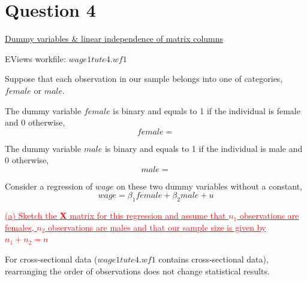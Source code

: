 \documentclass[12pt]{report}
\begin{document}
\newpage
\section*{Question 4}
\noindent \underline{Dummy variables \& linear independence of matrix columns}

\noindent EViews workfile: $wage1tute4.wf1$

\noindent Suppose that each observation in our sample belongs into one of categories, $female$ or $male$. 

\noindent The dummy variable $female$ is binary and equals to 1 if the individual is female and 0 otherwise, 
$$female =  $$

\noindent The dummy variable $male$ is binary and equals to 1 if the individual is male and 0 otherwise, 
$$male =  $$

\noindent Consider a regression of $wage$ on these two dummy variables without a constant,
$$wage = \beta_1female + \beta_2male + u$$

\noindent \textcolor{red}{\ul{(a) Sketch the \textbf{X} matrix for this regression and assume that $n_1$ observations are females, $n_2$ observations are males and that our sample size is given by $n_1+n_2=n$}}

\noindent For cross-sectional data ($wage1tute4.wf1$ contains cross-sectional data), rearranging the order of observations  does not change statistical results.
\end{document}
